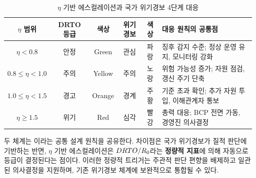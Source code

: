 \begin{table}[htbp]
\centering
\caption{$\eta$ 기반 에스컬레이션과 국가 위기경보 4단계 대응}
\label{tab:eta-crisis-alert-mapping}
\small
\begin{tabularx}{\textwidth}{c c c c c X}
\toprule
\textbf{$\eta$ 범위} & \textbf{DRTO 등급} & \textbf{색상} & \textbf{위기경보} & \textbf{색상} & \textbf{대응 원칙의 공통점} \\
\midrule
$\eta < 0.8$ & 안정 & Green & 관심 & 파랑 &
  징후 감지 수준; 정상 운영 유지, 모니터링 강화 \\
\addlinespace
$0.8 \leq \eta < 1.0$ & 주의 & Yellow & 주의 & 노랑 &
  위험 가능성 증가; 자원 점검, 갱신 주기 단축 \\
\addlinespace
$1.0 \leq \eta < 1.5$ & 경고 & Orange & 경계 & 주황 &
  기준 초과 확인; 추가 자원 투입, 이해관계자 통보 \\
\addlinespace
$\eta \geq 1.5$ & 위기 & Red & 심각 & 빨강 &
  총력 대응; BCP 전면 가동, 경영진 의사결정 \\
\bottomrule
\end{tabularx}
\end{table}

두 체계는 이라는
공통 설계 원칙을 공유한다.
차이점은 국가 위기경보가 질적 판단에 기반하는 반면,
$\eta$ 기반 에스컬레이션은 $DRTO / R_0$라는 \textbf{정량적 지표}에
의해 자동으로 등급이 결정된다는 점이다.
이러한 정량적 트리거는 주관적 판단 편향을 배제하고
일관된 의사결정을 지원하며, 기존 위기경보 체계에 보완적으로
통합될 수 있다.

